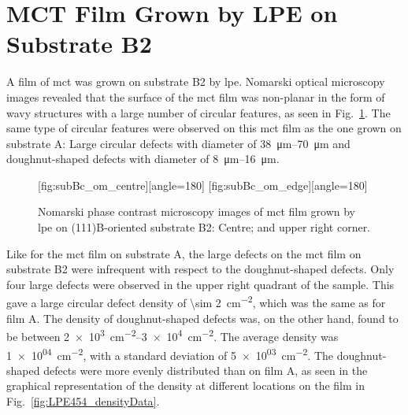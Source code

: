 \clearpage
\section{MCT Film Grown by LPE on Substrate B2}\label{sec:subBc}

A film of \ac{mct} was grown on substrate B2 by \ac{lpe}. Nomarski optical microscopy images revealed that the surface of the \ac{mct} film was non-planar in the form of wavy structures with a large number of circular features, as seen in Fig.~\ref{fig:subBc_om}. The same type of circular features were observed on this \ac{mct} film as the one grown on substrate A: Large circular defects with diameter of \SIrange{38}{70}{\micro\metre} and doughnut-shaped defects with diameter of \SIrange{8}{16}{\micro\metre}.

\begin{figure}[htbp]
    \centering
    [fig:subBc_om_centre][angle=180]
    \hfill
    [fig:subBc_om_edge][angle=180]
    \caption[Nomarski phase contrast microscopy images of \ac{mct} film grown by \ac{lpe} on substrate B2.]{Nomarski phase contrast microscopy images of \ac{mct} film grown by \ac{lpe} on (111)B-oriented substrate B2:  Centre; and  upper right corner.}
    \label{fig:subBc_om}
\end{figure}


Like for the \ac{mct} film on substrate A, the large defects on the \ac{mct} film on substrate B2 were infrequent with respect to the doughnut-shaped defects. Only four large defects were observed in the upper right quadrant of the sample. This gave a large circular defect density of \SI{\sim 2}{\centi\metre^{-2}}, which was the same as for film A. The density of doughnut-shaped defects was, on the other hand, found to be between \SIrange{2e+3}{3e+4}{\centi\metre^{-2}}. The average density was \SI{1e+04}{\centi\metre^{-2}}, with a standard deviation of \SI{5e+03}{\centi\metre^{-2}}. The doughnut-shaped defects were more evenly distributed than on film A, as seen in the graphical representation of the density at different locations on the film in Fig.~\ref{fig:LPE454_densityData}. 

